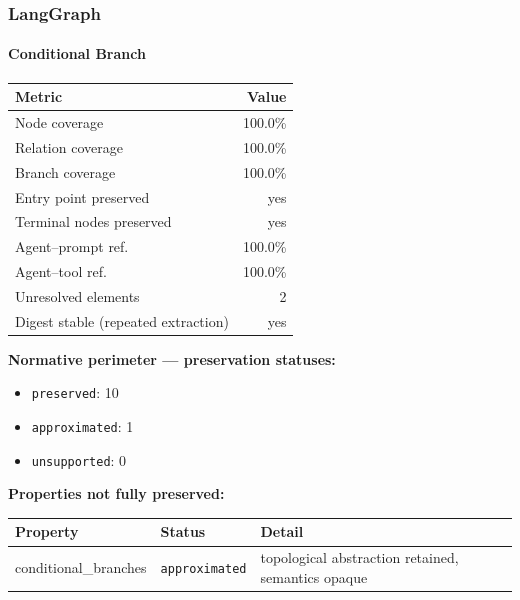 \documentclass[10pt]{article}
\newcommand{\statuspreserved}{\textcolor{preservedgreen}{\texttt{preserved}}}
\newcommand{\statusapproximated}{\textcolor{approximatedorange}{\texttt{approximated}}}
\newcommand{\statusunsupported}{\textcolor{unsupportedgray}{\texttt{unsupported}}}
\begin{document}
\subsubsection{LangGraph}

\paragraph{Conditional Branch}

\begin{table}[htbp]
	\centering
	\begin{tabular}{@{}lr@{}}
		\toprule
		\textbf{Metric} & \textbf{Value} \\
		\midrule
		Node coverage & 100.0\% \\
		Relation coverage & 100.0\% \\
		Branch coverage & 100.0\% \\
		Entry point preserved & yes \\
		Terminal nodes preserved & yes \\
		Agent--prompt ref. & 100.0\% \\
		Agent--tool ref. & 100.0\% \\
		Unresolved elements & 2 \\
		Digest stable (repeated extraction) & yes \\
		\bottomrule
	\end{tabular}
\end{table}

\textbf{Normative perimeter --- preservation statuses:}
\begin{itemize}[nosep]
	\item \statuspreserved{}: 10
	\item \statusapproximated{}: 1
	\item \statusunsupported{}: 0
\end{itemize}

\textbf{Properties not fully preserved:}

\begin{table}[htbp]
	\centering
	\small
	\begin{tabular}{@{}llp{8cm}@{}}
		\toprule
		\textbf{Property} & \textbf{Status} & \textbf{Detail} \\
		\midrule
		conditional\_branches & \statusapproximated{} & topological abstraction retained, semantics opaque \\
		\bottomrule
	\end{tabular}
\end{table}
\end{document}

